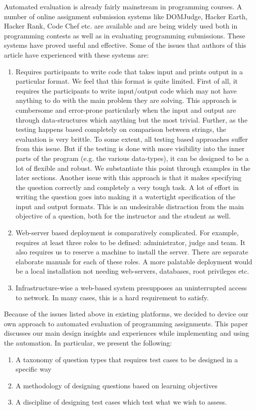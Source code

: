 \documentclass[12pt]{article}
\begin{document}
Automated evaluation is already fairly mainstream in programming courses. A number of online assignment submission systems like DOMJudge, Hacker Earth, Hacker Rank, Code Chef etc. are available and are being widely used both in programming contests as well as in evaluating programming submissions. These systems have proved useful and effective. Some of the issues that authors of this article have experienced with these systems are:
\begin{enumerate}
\item Requires participants to write code that takes input and prints output in a particular format. We feel that this format is quite limited. First of all, it requires the participants to write input/output code which may not have anything to do with the main problem they are solving. This approach is cumbersome and error-prone particularly when the input and output are through data-structures which anything but the most trivial. Further, as the testing happens based completely on comparison between strings, the evaluation is very brittle. To some extent, all testing based approaches suffer from this issue. But if the testing is done with more visibility into the inner parts of the program (e.g. the various data-types), it can be designed to be a lot of flexible and robust. We substantiate this point through examples in the later sections. Another issue with this approach is that it makes specifying the question correctly and completely a very tough task. A lot of effort in writing the question goes into making it a watertight specification of the input and output formats. This is an undesirable distraction from the main objective of a question, both for the instructor and the student as well.

\item Web-server based deployment is comparatively complicated. For example, \cite{domjudge} requires at least three roles to be defined: administrator, judge and team. It also requires us to reserve a machine to install the server. There are separate elaborate manuals for each of these roles. A more palatable deployment would be a local installation not needing web-servers, databases, root privileges etc.

\item Infrastructure-wise a web-based system presupposes an uninterrupted access to network. In many cases, this is a hard requirement to satisfy.
\end{enumerate}

Because of the issues listed above in existing platforms, we decided to device our own approach to automated evaluation of programming assignments. This paper discusses our main design insights and experiences while implementing and using the automation. In particular, we present the following:
\begin{enumerate}
\item A taxonomy of question types that requires test cases to be designed in a specific way
\item A methodology of designing questions based on learning objectives
\item A discipline of designing test cases which test what we wish to assess.
\end{enumerate}
\end{document}
